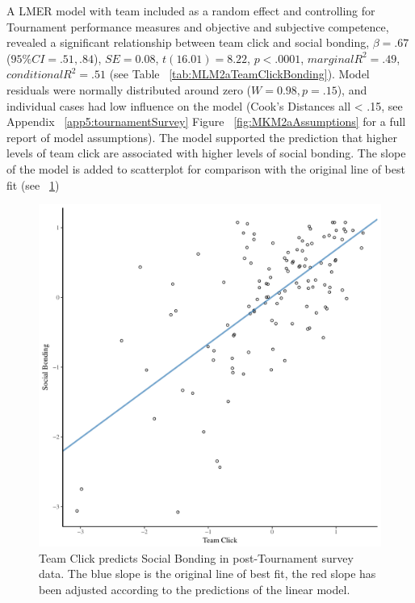  A LMER model with team included as a random effect and controlling for Tournament performance measures and objective and subjective competence, revealed a significant relationship between team click and social bonding, $\beta = .67$ ($95\% CI =  .51, .84$), $SE = 0.08$, $t(16.01) = 8.22$, $p < .0001$, $marginal R^2 = .49$, $conditional R^2 = .51$ (see Table ~\ref{tab:MLM2aTeamClickBonding}).  Model residuals were normally distributed around zero ($W = 0.98, p = .15$), and individual cases had low influence on the model (Cook's Distances all < .15, see Appendix ~\ref{app5:tournamentSurvey} Figure ~\ref{fig:MKM2aAssumptions} for a full report of model assumptions).  The model supported the prediction that higher levels of team click are associated with higher levels of social bonding.
 The slope of the model is added to scatterplot for comparison with the original line of best fit (see ~\ref{fig:clickBondModelSlope})

  

  \begin{figure}[htbp]
    \centering
  \includegraphics[scale=.5]{images/clickBondModelSlope.pdf}
    \caption{Team Click predicts Social Bonding in post-Tournament survey data. The blue slope is the original line of best fit, the red slope has been adjusted according to the predictions of the linear model.}
    \label{fig:clickBondModelSlope}
  \end{figure}



